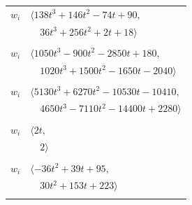 \documentclass[11pt]{article}
\begin{document}
\begin{longtable}{@{}ll@{}}
$w_i$ & $\langle 138t^{3}+146t^{2}-74t+90,$\\
 & $\quad 36t^{3}+256t^{2}+2t+18\rangle$\\
\addlinespace[2pt]
\multicolumn{2}{@{}p{0.97\textwidth}@{}}{$i=33$, $D_i=1$, $\rho_{ij}$: $1{:}2, \allowbreak 10{:}1, \allowbreak 12{:}1, \allowbreak 15{:}1, \allowbreak 16{:}1, \allowbreak 26{:}1, \allowbreak 38{:}2, \allowbreak 41{:}2, \allowbreak 55{:}2, \allowbreak 59{:}2, \allowbreak 61{:}1, \allowbreak 69{:}2, \allowbreak 71{:}1, \allowbreak 73{:}1, \allowbreak 93{:}1$}\\
$w_i$ & $\langle 1050t^{3}-900t^{2}-2850t+180,$\\
 & $\quad 1020t^{3}+1500t^{2}-1650t-2040\rangle$\\
\addlinespace[2pt]
\multicolumn{2}{@{}p{0.97\textwidth}@{}}{$i=34$, $D_i=1$, $\rho_{ij}$: $1{:}1, \allowbreak 10{:}1, \allowbreak 13{:}2, \allowbreak 15{:}2, \allowbreak 17{:}2, \allowbreak 27{:}2, \allowbreak 42{:}1, \allowbreak 55{:}1, \allowbreak 57{:}2, \allowbreak 60{:}2, \allowbreak 69{:}2, \allowbreak 70{:}2, \allowbreak 73{:}2, \allowbreak 84{:}1, \allowbreak 95{:}1$}\\
$w_i$ & $\langle 5130t^{3}+6270t^{2}-10530t-10410,$\\
 & $\quad 4650t^{3}-7110t^{2}-14400t+2280\rangle$\\
\addlinespace[2pt]
\multicolumn{2}{@{}p{0.97\textwidth}@{}}{$i=35$, $D_i=1$, $\rho_{ij}$: $23{:}1, \allowbreak 32{:}2$}\\
$w_i$ & $\langle 2t,$\\
 & $\quad 2\rangle$\\
\addlinespace[2pt]
\multicolumn{2}{@{}p{0.97\textwidth}@{}}{$i=36$, $D_i=1$, $\rho_{ij}$: $3{:}2, \allowbreak 5{:}1, \allowbreak 8{:}1, \allowbreak 9{:}2, \allowbreak 12{:}1, \allowbreak 16{:}1, \allowbreak 17{:}2, \allowbreak 21{:}1, \allowbreak 47{:}2, \allowbreak 68{:}1, \allowbreak 69{:}1, \allowbreak 70{:}2, \allowbreak 73{:}2, \allowbreak 78{:}1, \allowbreak 81{:}1, \allowbreak 85{:}1, \allowbreak 86{:}1$}\\
$w_i$ & $\langle -36t^{2}+39t+95,$\\
 & $\quad 30t^{2}+153t+223\rangle$\\
\addlinespace[2pt]
\multicolumn{2}{@{}p{0.97\textwidth}@{}}{$i=37$, $D_i=1$, $\rho_{ij}$: $3{:}1, \allowbreak 5{:}2, \allowbreak 9{:}2, \allowbreak 10{:}2, \allowbreak 12{:}1, \allowbreak 15{:}1, \allowbreak 16{:}1, \allowbreak 17{:}2, \allowbreak 24{:}2, \allowbreak 29{:}2, \allowbreak 43{:}2, \allowbreak 44{:}2, \allowbreak 67{:}2, \allowbreak 68{:}1, \allowbreak 70{:}2, \allowbreak 75{:}2, \allowbreak 89{:}1$}\\

\end{longtable}
\end{document}
